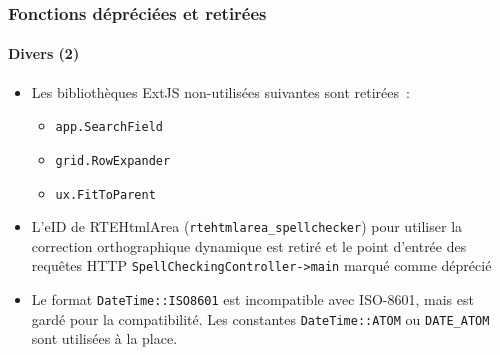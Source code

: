 \begin{frame}[fragile]
	\frametitle{Fonctions dépréciées et retirées}
	\framesubtitle{Divers (2)}

	\begin{itemize}

		\item Les bibliothèques ExtJS non-utilisées suivantes sont retirées~:

			\begin{itemize}
				\item \texttt{app.SearchField}
				\item \texttt{grid.RowExpander}
				\item \texttt{ux.FitToParent}
			\end{itemize}

		\item L'eID de RTEHtmlArea (\texttt{rtehtmlarea\_spellchecker}) pour
			utiliser la correction orthographique dynamique est retiré et le point d'entrée des requêtes HTTP
			\texttt{SpellCheckingController->main} marqué comme déprécié

		\item Le format \texttt{DateTime::ISO8601} est incompatible avec ISO-8601,
			mais est gardé pour la compatibilité.
			Les constantes \texttt{DateTime::ATOM} ou \texttt{DATE\_ATOM} sont utilisées à la place.

	\end{itemize}

\end{frame}


